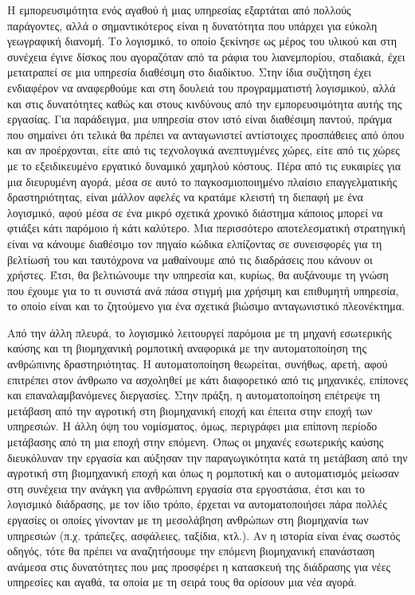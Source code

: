 \documentclass[
]{article}
\begin{document}
Η εμπορευσιμότητα ενός αγαθού ή μιας υπηρεσίας εξαρτάται από πολλούς
παράγοντες, αλλά ο σημαντικότερος είναι η δυνατότητα που υπάρχει για
εύκολη γεωγραφική διανομή. Το λογισμικό, το οποίο ξεκίνησε ως μέρος του
υλικού και στη συνέχεια έγινε δίσκος που αγοραζόταν από τα ράφια του
λιανεμπορίου, σταδιακά, έχει μετατραπεί σε μια υπηρεσία διαθέσιμη στο
διαδίκτυο. Στην ίδια συζήτηση έχει ενδιαφέρον να αναφερθούμε και στη
δουλειά του προγραμματιστή λογισμικού, αλλά και στις δυνατότητες καθώς
και στους κινδύνους από την εμπορευσιμότητα αυτής της εργασίας. Για
παράδειγμα, μια υπηρεσία στον ιστό είναι διαθέσιμη παντού, πράγμα που
σημαίνει ότι τελικά θα πρέπει να ανταγωνιστεί αντίστοιχες προσπάθειες
από όπου και αν προέρχονται, είτε από τις τεχνολογικά ανεπτυγμένες
χώρες, είτε από τις χώρες με το εξειδικευμένο εργατικό δυναμικό χαμηλού
κόστους. Πέρα από τις ευκαιρίες για μια διευρυμένη αγορά, μέσα σε αυτό
το παγκοσμιοποιημένο πλαίσιο επαγγελματικής δραστηριότητας, είναι μάλλον
αφελές να κρατάμε κλειστή τη διεπαφή με ένα λογισμικό, αφού μέσα σε ένα
μικρό σχετικά χρονικό διάστημα κάποιος μπορεί να φτιάξει κάτι παρόμοιο ή
κάτι καλύτερο. Μια περισσότερο αποτελεσματική στρατηγική είναι να
κάνουμε διαθέσιμο τον πηγαίο κώδικα ελπίζοντας σε συνεισφορές για τη
βελτίωσή του και ταυτόχρονα να μαθαίνουμε από τις διαδράσεις που κάνουν
οι χρήστες. Έτσι, θα βελτιώνουμε την υπηρεσία και, κυρίως, θα αυξάνουμε
τη γνώση που έχουμε για το τι συνιστά ανά πάσα στιγμή μια χρήσιμη και
επιθυμητή υπηρεσία, το οποίο είναι και το ζητούμενο για ένα σχετικά
βιώσιμο ανταγωνιστικό πλεονέκτημα.

Από την άλλη πλευρά, το λογισμικό λειτουργεί παρόμοια με τη μηχανή
εσωτερικής καύσης και τη βιομηχανική ρομποτική αναφορικά με την
αυτοματοποίηση της ανθρώπινης δραστηριότητας. Η αυτοματοποίηση
θεωρείται, συνήθως, αρετή, αφού επιτρέπει στον άνθρωπο να ασχοληθεί με
κάτι διαφορετικό από τις μηχανικές, επίπονες και επαναλαμβανόμενες
διεργασίες. Στην πράξη, η αυτοματοποίηση επέτρεψε τη μετάβαση από την
αγροτική στη βιομηχανική εποχή και έπειτα στην εποχή των υπηρεσιών. Η
άλλη όψη του νομίσματος, όμως, περιγράφει μια επίπονη περίοδο μετάβασης
από τη μια εποχή στην επόμενη. Όπως οι μηχανές εσωτερικής καύσης
διευκόλυναν την εργασία και αύξησαν την παραγωγικότητα κατά τη μετάβαση
από την αγροτική στη βιομηχανική εποχή και όπως η ρομποτική και ο
αυτοματισμός μείωσαν στη συνέχεια την ανάγκη για ανθρώπινη εργασία στα
εργοστάσια, έτσι και το λογισμικό διάδρασης, με τον ίδιο τρόπο, έρχεται
να αυτοματοποιήσει πάρα πολλές εργασίες οι οποίες γίνονταν με τη
μεσολάβηση ανθρώπων στη βιομηχανία των υπηρεσιών (π.χ. τράπεζες,
ασφάλειες, ταξίδια, κτλ.). Αν η ιστορία είναι ένας σωστός οδηγός, τότε
θα πρέπει να αναζητήσουμε την επόμενη βιομηχανική επανάσταση ανάμεσα
στις δυνατότητες που μας προσφέρει η κατασκευή της διάδρασης για νέες
υπηρεσίες και αγαθά, τα οποία με τη σειρά τους θα ορίσουν μια νέα αγορά.
\end{document}
